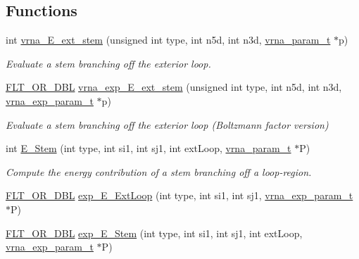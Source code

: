 \subsection*{Functions}
\begin{DoxyCompactItemize}
\item 
int \hyperlink{group__loops_gaa0c313c90da11aa741dcd62746d85337}{vrna\+\_\+\+E\+\_\+ext\+\_\+stem} (unsigned int type, int n5d, int n3d, \hyperlink{group__energy__parameters_ga8a69ca7d787e4fd6079914f5343a1f35}{vrna\+\_\+param\+\_\+t} $\ast$p)
\begin{DoxyCompactList}\small\item\em Evaluate a stem branching off the exterior loop. \end{DoxyCompactList}\item 
\hyperlink{group__data__structures_ga31125aeace516926bf7f251f759b6126}{F\+L\+T\+\_\+\+O\+R\+\_\+\+D\+BL} \hyperlink{group__loops_ga357484958d3cd677f88f16c75c8a5730}{vrna\+\_\+exp\+\_\+\+E\+\_\+ext\+\_\+stem} (unsigned int type, int n5d, int n3d, \hyperlink{group__energy__parameters_ga01d8b92fe734df8d79a6169482c7d8d8}{vrna\+\_\+exp\+\_\+param\+\_\+t} $\ast$p)
\begin{DoxyCompactList}\small\item\em Evaluate a stem branching off the exterior loop (Boltzmann factor version) \end{DoxyCompactList}\item 
int \hyperlink{group__loops_ga51f9851f3500c2aae66674142a6a2dd5}{E\+\_\+\+Stem} (int type, int si1, int sj1, int ext\+Loop, \hyperlink{group__energy__parameters_ga8a69ca7d787e4fd6079914f5343a1f35}{vrna\+\_\+param\+\_\+t} $\ast$P)
\begin{DoxyCompactList}\small\item\em Compute the energy contribution of a stem branching off a loop-\/region. \end{DoxyCompactList}\item 
\hyperlink{group__data__structures_ga31125aeace516926bf7f251f759b6126}{F\+L\+T\+\_\+\+O\+R\+\_\+\+D\+BL} \hyperlink{group__loops_ga446828a191c127861e76e2c84055f672}{exp\+\_\+\+E\+\_\+\+Ext\+Loop} (int type, int si1, int sj1, \hyperlink{group__energy__parameters_ga01d8b92fe734df8d79a6169482c7d8d8}{vrna\+\_\+exp\+\_\+param\+\_\+t} $\ast$P)
\item 
\hyperlink{group__data__structures_ga31125aeace516926bf7f251f759b6126}{F\+L\+T\+\_\+\+O\+R\+\_\+\+D\+BL} \hyperlink{group__loops_gab0aa9833ab41875a91a9be8a5ffd7092}{exp\+\_\+\+E\+\_\+\+Stem} (int type, int si1, int sj1, int ext\+Loop, \hyperlink{group__energy__parameters_ga01d8b92fe734df8d79a6169482c7d8d8}{vrna\+\_\+exp\+\_\+param\+\_\+t} $\ast$P)

\end{DoxyCompactItemize}

